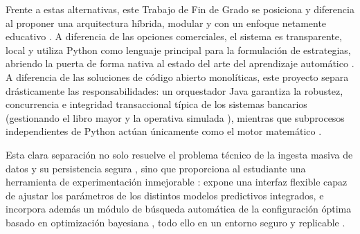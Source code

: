 Frente a estas alternativas, este Trabajo de Fin de Grado se posiciona y diferencia al proponer una arquitectura híbrida, modular y con un enfoque netamente educativo \parencite{chan_algorithmic_2013}. A diferencia de las opciones comerciales, el sistema es transparente, local y utiliza Python como lenguaje principal para la formulación de estrategias, abriendo la puerta de forma nativa al estado del arte del aprendizaje automático \parencite{lopez_de_prado_advances_2018}. A diferencia de las soluciones de código abierto monolíticas, este proyecto separa drásticamente las responsabilidades: un orquestador Java \parencite{pivotal_springboot_2024} garantiza la robustez, concurrencia e integridad transaccional típica de los sistemas bancarios \parencite{oracle_mysql_acid_2024} (gestionando el libro mayor y la operativa simulada \parencite{chan_algorithmic_2013}), mientras que subprocesos independientes de Python actúan únicamente como el motor matemático \parencite{hilpisch_python_2018}.

Esta clara separación no solo resuelve el problema técnico de la ingesta masiva de datos y su persistencia segura \parencite{kimball_data_2004}, sino que proporciona al estudiante una herramienta de experimentación inmejorable \parencite{lusardi_economic_2014}: expone una interfaz flexible capaz de ajustar los parámetros de los distintos modelos predictivos integrados, e incorpora además un módulo de búsqueda automática de la configuración óptima basado en optimización bayesiana \parencite{feurer_hyperparameter_2019}, todo ello en un entorno seguro y replicable \parencite{lopez_de_prado_advances_2018}.